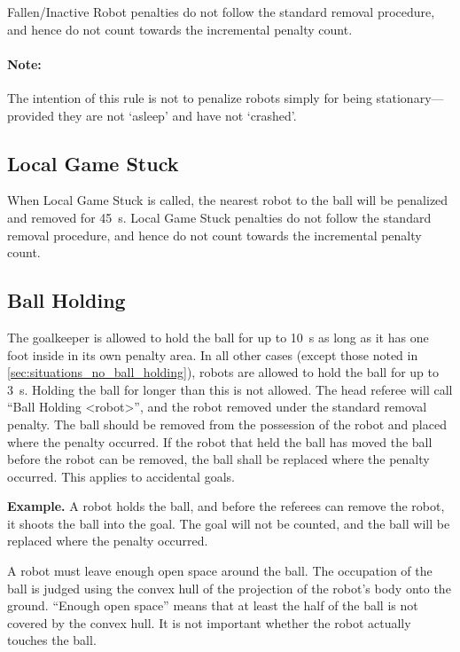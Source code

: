Fallen/Inactive Robot penalties do not follow the standard removal procedure, and hence do not count towards the incremental penalty count.

\paragraph{Note:} The intention of this rule is not to penalize robots simply for being stationary---provided they are not `asleep' and have not `crashed'.

\subsection{Local Game Stuck}
\label{sec:pen_local_game_stuck}

When Local Game Stuck is called, the nearest robot to the ball will be penalized and removed for \qty{45}{\second}.
Local Game Stuck penalties do not follow the standard removal procedure, and hence do not count towards the incremental penalty count.

\subsection{Ball Holding}
\label{sec:ball_holding}

The goalkeeper is allowed to hold the ball for up to \qty{10}{\second} as long as it has one foot inside in its own penalty area.
In all other cases (except those noted in \cref{sec:situations_no_ball_holding}), robots are allowed to hold the ball for up to \qty{3}{\second}.
Holding the ball for longer than this is not allowed.
The head referee will call ``Ball Holding \textless robot\textgreater'', and the robot removed under the standard removal penalty.
The ball should be removed from the possession of the robot and placed where the penalty occurred.
If the robot that held the ball has moved the ball before the robot can be removed, the ball shall be replaced where the penalty occurred.
This applies to accidental goals.

\textbf{Example.} A robot holds the ball, and before the referees can remove the robot, it shoots the ball into the goal.
The goal will not be counted, and the ball will be replaced where the penalty occurred.

A robot must leave enough open space around the ball.
The occupation of the ball is judged using the convex hull of the projection of the robot's body onto the ground.
``Enough open space'' means that at least the half of the ball is not covered by the convex hull.
It is not important whether the robot actually touches the ball.

